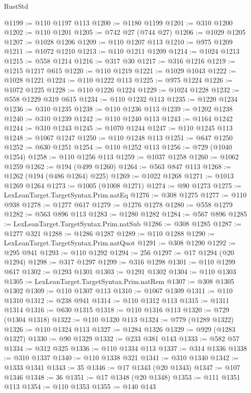 \begin{lexlean}{RustStd}
\begin{coremodule}
{\begin{coremodule}
{{{{{{{{{{{{{{{{{{{{{{{{{{{{{{{{{{{{{{{{{{{{{@1199 := @110 @1197 @113
@1200 := @1180 @1199
@1201 := @310 @1200
@1202 := @110 @1201
@1205 := @742 @27 (@744 @27)
@1206 := @1029 @1205
@1207 := @1028 @1206
@1209 := @110 @1207 @113
@1210 := @975 @1209
@1211 := @1072 @1210
@1213 := @110 @1211 @1209
@1214 := @1024 @1213
@1215 := @558 @1214
@1216 := @317 @30
@1217 := @316 @1216
@1219 := @1215 @1217 @615
@1220 := @110 @1219
@1221 := @1029 @1043
@1222 := @1028 @1221
@1224 := @110 @1222 @113
@1225 := @975 @1224
@1226 := @1072 @1225
@1228 := @110 @1226 @1224
@1229 := @1024 @1228
@1232 := @558 @1229 @319 @615
@1234 := @110 @1232 @113
@1235 := @1220 @1234
@1236 := @310 @1235
@1238 := @110 @1236 @113
@1239 := @1202 @1238
@1240 := @310 @1239
@1242 := @110 @1240 @113
@1243 := @1164 @1242
@1244 := @310 @1243
@1245 := @1070 @1244
@1247 := @110 @1245 @113
@1248 := @1067 @1247
@1250 := @110 @1248 @113
@1251 := @647 @1250
@1252 := @630 @1251
@1254 := @110 @1252 @113
@1256 := @729 (@1040 @1254)
@1258 := @110 @1256 @113
@1259 := @1037 @1258
@1260 := @1062 @1259
@1262 := @194 (@499 @1260)
@1264 := @563 @847 @113
@1268 := @1262 (@194 (@486 @1264) @225)
@1269 := @1022 @1268
@1271 := @1013 @1269 @1264
@1273 := @1005 (@1008 @1271)
@1274 := @90 @1273
@1275 := LexLeanTarget.TargetSyntax.Prim.natEq
@1276 := @308 @1275
@1277 := @110 @938
@1278 := @1277 @617
@1279 := @1276 @1278
@1280 := @558 @1279
@1282 := @563 @896 @113
@1283 := @1280 @1282
@1284 := @567 @896
@1285 := LexLeanTarget.TargetSyntax.Prim.natSub
@1286 := @308 @1285
@1287 := @1277 @321
@1288 := @1286 @1287
@1289 := @110 @1288
@1290 := LexLeanTarget.TargetSyntax.Prim.natQuot
@1291 := @308 @1290
@1292 := @295 @941
@1293 := @110 @1292
@1294 := 256
@1297 := @17 @1294 (@20 @1294)
@1298 := @317 @1297
@1299 := @316 @1298
@1301 := @110 @1299 @617
@1302 := @1293 @1301
@1303 := @1291 @1302
@1304 := @110 @1303
@1305 := LexLeanTarget.TargetSyntax.Prim.natRem
@1307 := @308 @1305 @1302
@1309 := @110 @1307 @113
@1310 := @1067 @1309
@1311 := @110 @1310
@1312 := @238 @941
@1314 := @110 @1312 @113
@1315 := @1311 @1314
@1316 := @630 @1315
@1318 := @110 @1316 @113
@1320 := @729 (@1304 @1318)
@1322 := @110 @1320 @113
@1324 := @779 (@1289 @1322)
@1326 := @110 @1324 @113
@1327 := @1284 @1326
@1329 := @929 (@1283 @1327)
@1330 := @90 @1329
@1332 := @233 @381 @143
@1333 := @582 @57
@1334 := @312 @325
@1336 := @110 @1334 @113
@1337 := @314 @1336
@1338 := @310 @1337
@1340 := @110 @1338 @321
@1341 := @310 @1340
@1342 := @1333 @1341
@1343 := 35
@1346 := @17 @1343 (@20 @1343)
@1347 := @107 @1346
@1348 := 36
@1351 := @17 @1348 (@20 @1348)
@1353 := @111 @1351 @113
@1354 := @110 @1353
@1355 := @140 @143
}}}}}}}}}}}}}}}}}}}}}}}}}}}}}}}}}}}}}}}}}}}}}
\end{coremodule}}
\end{coremodule}
\end{lexlean}
